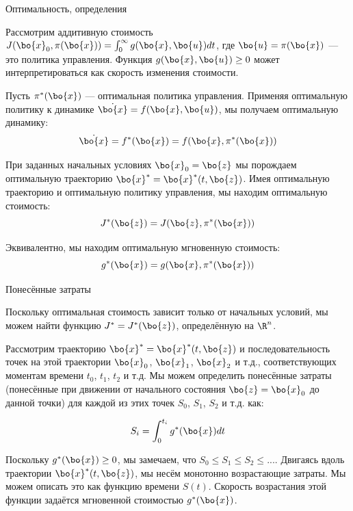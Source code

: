 \documentclass{beamer}
\begin{document}
\begin{frame}{Оптимальность, определения}
	\begin{flushleft}
		
		Рассмотрим аддитивную стоимость $J (\bo{x}_0, \pi (\bo{x})) = \int_0^\infty g(\bo{x}, \bo{u}) dt$, где $\bo{u} = \pi (\bo{x})$ — это политика управления. Функция $g(\bo{x}, \bo{u}) \geq 0$ может интерпретироваться как скорость изменения стоимости.
		
		\bigskip
		
		Пусть $\pi^*(\bo{x})$ — оптимальная политика управления. Применяя оптимальную политику к динамике $\dot{\bo{x}} = f(\bo{x}, \bo{u})$, мы получаем оптимальную динамику:
		\begin{equation}
			\dot{\bo{x}} = f^*(\bo{x}) = f(\bo{x}, \pi^*(\bo{x}))
		\end{equation}
		
		При заданных начальных условиях $\bo{x}_0 = \bo{z}$ мы порождаем оптимальную траекторию $\bo{x}^* = \bo{x}^*(t, \bo{z})$. Имея оптимальную траекторию и оптимальную политику управления, мы находим оптимальную стоимость:
		\begin{equation}
			J^*(\bo{z}) = J(\bo{z}, \pi^* (\bo{x}))
		\end{equation}
		
		Эквивалентно, мы находим оптимальную мгновенную стоимость:
		\begin{equation}
			g^*(\bo{x}) = g(\bo{x}, \pi^* (\bo{x}))
		\end{equation}
		
		
	\end{flushleft}
\end{frame}



\begin{frame}{Понесённые затраты}
	\begin{flushleft}
		
		{\small 
		Поскольку оптимальная стоимость зависит только от начальных условий, мы можем найти функцию $J^* = J^*(\bo{z})$, определённую на $\R^n$.
		
		\bigskip
		
		Рассмотрим траекторию $\bo{x}^* = \bo{x}^*(t, \bo{z})$ и последовательность точек на этой траектории $\bo{x}_0$, $\bo{x}_1$, $\bo{x}_2$ и т.д., соответствующих моментам времени $t_0$, $t_1$, $t_2$ и т.д. Мы можем определить понесённые затраты (понесённые при движении от начального состояния $\bo{z} = \bo{x}_0$ до данной точки) для каждой из этих точек $S_0$, $S_1$, $S_2$ и т.д. как:
		
		\begin{equation}
			S_i = \int_0^{t_i} g^*(\bo{x}) dt
		\end{equation}
		
		Поскольку $g^*(\bo{x}) \geq 0$, мы замечаем, что $S_0 \leq S_1 \leq S_2 \leq ...$. Двигаясь вдоль траектории $\bo{x}^*(t, \bo{z})$, мы несём монотонно возрастающие затраты. Мы можем описать это как функцию времени $S(t)$. Скорость возрастания этой функции задаётся мгновенной стоимостью $g^*(\bo{x})$.
	}
		
	\end{flushleft}
\end{frame}
\end{document}
